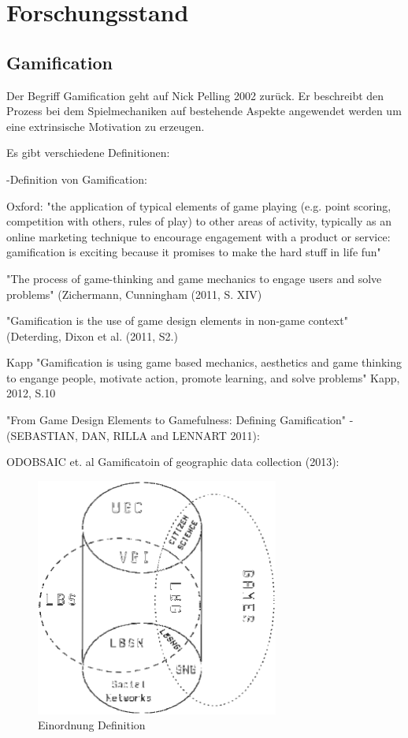 \chapter{Forschungsstand}
\label{sec:S3_Forschungsstand}

\section{Gamification}
\label{subsec:S3_Gamification}

Der Begriff Gamification geht auf Nick Pelling 2002 zurück.
Er beschreibt den Prozess bei dem Spielmechaniken auf bestehende Aspekte angewendet werden um eine extrinsische Motivation zu erzeugen.\citep{Marczewski.2013}



Es gibt verschiedene Definitionen:

-Definition von Gamification:

Oxford:
"the application of typical elements of game playing (e.g. point scoring, competition with others, rules of play) to other areas of activity, typically as an online marketing technique to encourage engagement with a product or service:
gamification is exciting because it promises to make the hard stuff in life fun"

"The process of game-thinking and game mechanics to engage users and solve problems"
(Zichermann, Cunningham (2011, S. XIV)

"Gamification is the use of game design elements in non-game context"
(Deterding, Dixon et al. (2011, S2.)

Kapp "Gamification is using game based mechanics, aesthetics and game thinking to engange people, motivate action, promote learning, and solve problems"
Kapp, 2012, S.10


"From Game Design Elements to Gamefulness: Defining Gamification" - (SEBASTIAN, DAN, RILLA and LENNART 2011):


ODOBSAIC et. al Gamificatoin of geographic data collection (2013):

\begin{figure}[H]
\begin{center}
\includegraphics[width=80mm]{images/ch3_img01_LBG_SN_etc.png}
\caption{Einordnung Definition}
\label{img:ch3_img01_LBG_SN_etc}
\end{center}
\end{figure}

